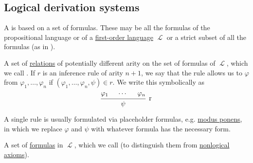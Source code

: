 \subsection{Logical derivation systems}\label{subsec:logical_derivation_systems}

\begin{definition}\label{def:logical_derivation_system}
  A  is based on a set of formulas. These may be all the formulas of the propositional language or of a \hyperref[def:first_order_syntax]{first-order language} \( \mscrL \) or a strict subset of all the formulas (as in ).

  \begin{thmenum}
     A set of \hyperref[def:relation]{relations} of potentially different arity on the set of formulas of \( \mscrL \), which we call . If \( r \) is an inference rule of arity \( n + 1 \), we say that the rule allows us to  \( \varphi \) from \( \varphi_1, \ldots, \varphi_n \) if \( (\varphi_1, \ldots, \varphi_n, \psi) \in r \). We write this symbolically as
    \begin{equation*}
      \begin{prooftree}
        \hypo{\varphi_1}
        \hypo{\cdots}
        \hypo{\varphi_n}
        \infer3[r]{\psi}
      \end{prooftree}
    \end{equation*}

    A single rule is usually formulated via placeholder formulas, e.g. \hyperref[eq:def:positive_implicational_propositional_derivation_system/rules/modus_ponens]{modus ponens}, in which we replace \( \varphi \) and \( \psi \) with whatever formula has the necessary form.

     A set of \hyperref[def:first_order_syntax]{formulas} in \( \mscrL \), which we call  (to distinguish them from \hyperref[def:derivation_system_derivability]{nonlogical axioms}).
  \end{thmenum}
\end{definition}

